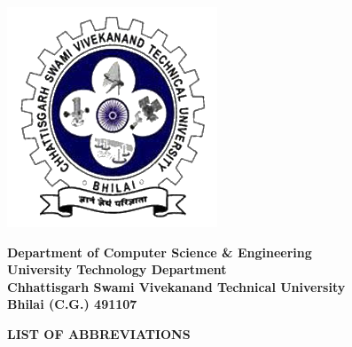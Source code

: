 \newpage
\begin{minipage}{0.17\textwidth}
  \centering
  \includegraphics[width=\textwidth]{images/logo.png}
\end{minipage}
\hfil
\large
\begin{minipage}{0.7\textwidth}
  \centering
  \textbf{Department of Computer Science \& Engineering}\\
  \textbf{University Technology Department}\\
  \textbf{Chhattisgarh Swami Vivekanand Technical University}\\
  \textbf{Bhilai (C.G.) 491107}
\end{minipage}

\noindent\makebox[\linewidth]{\rule{\textwidth}{0.4pt}}

\begin{center}
  \Large\textbf{LIST OF ABBREVIATIONS}
\end{center}

\vspace{0.5cm}


